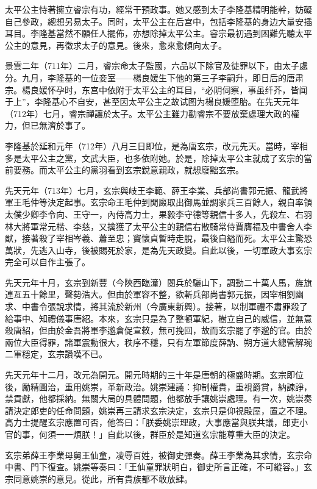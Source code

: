 太平公主恃著擁立睿宗有功，經常干預政事。她又感到太子李隆基精明能幹，妨礙自己參政，總想另易太子。同时，太平公主在后宫中，包括李隆基的身边大量安插耳目。李隆基當然不願任人擺佈，亦想除掉太平公主。睿宗最初遇到困難先聽太平公主的意見，再徵求太子的意見。後來，愈來愈傾向太子。

景雲二年（711年）二月，睿宗命太子監國，六品以下除官及徒罪以下，由太子處分。九月，李隆基的一位妾室——楊良媛生下他的第三子李嗣升，即日后的唐肃宗。楊良媛怀孕时，东宫中依附于太平公主的耳目，“必阴伺察，事虽纤芥，皆闻于上”，李隆基心不自安，甚至因太平公主之故试图为楊良媛堕胎。在先天元年（712年）七月，睿宗禪讓於太子。太平公主雖力勸睿宗不要放棄處理大政的權力，但已無濟於事了。

李隆基於延和元年（712年）八月三日即位，是為唐玄宗，改元先天。當時，宰相多是太平公主之黨，文武大臣，也多依附她。於是，除掉太平公主就成了玄宗的當前要務。而太平公主的黨羽看到玄宗銳意親政，就想廢黜玄宗。

先天元年（713年）七月，玄宗與岐王李範、薛王李業、兵部尚書郭元振、龍武將軍王毛仲等決定起事。玄宗命王毛仲到閒廄取出御馬並調家兵三百餘人，親自率領太僕少卿李令向、王守一，內侍高力士，果毅李守德等親信十多人，先殺左、右羽林大將軍常元楷、李慈，又擒獲了太平公主的親信右散騎常侍賈膺福及中書舍人李猷，接著殺了宰相岑羲、蕭至忠；竇懷貞暫時走脫，最後自縊而死。太平公主驚恐萬狀，先逃入山寺，後被賜死於家，是為先天政變。自此以後，一切軍政大事玄宗完全可以自作主張了。

先天元年十月，玄宗到新豐（今陝西臨潼）閱兵於驪山下，調動二十萬人馬，旌旗連亙五十餘里，聲勢浩大。但由於軍容不整，欲斬兵部尚書郭元振，因宰相劉幽求、中書令張說求情，將其流於新州（今廣東新興）。接著，以制軍禮不肅罪殺了給事中、知禮儀事唐紹。本來，玄宗只是為了整頓軍紀，樹立自己的威信，並無意殺唐紹，但由於金吾將軍李邈倉促宣敕，無可挽回，故而玄宗罷了李邈的官。由於兩位大臣得罪，諸軍震動很大，秩序不穩，只有左軍節度薛訥、朔方道大總管解琬二軍穩定，玄宗讚嘆不已。

先天元年十二月，改元為開元。開元時期的三十年是唐朝的極盛時期。玄宗即位後，勵精圖治，重用姚崇，革新政治。姚崇建議：抑制權貴，重視爵賞，納諫諍，禁貢獻，他都採納。無關大局的具體問題，他都放手讓姚崇處理。有一次，姚崇奏請決定郎吏的任命問題，姚崇再三請求玄宗決定，玄宗只是仰視殿屋，置之不理。高力士提醒玄宗應置可否，他答曰：「朕委姚崇理政，大事應當與朕共議，郎吏小官的事，何須一一煩朕！」自此以後，群臣於是知道玄宗能尊重大臣的決定。

玄宗弟薛王李業母舅王仙童，凌辱百姓，被御史彈奏。薛王李業為其求情，玄宗命中書、門下復查。姚崇等奏曰：「王仙童罪狀明白，御史所言正確，不可縱容。」玄宗同意姚崇的意見。從此，所有貴族都不敢放肆。

